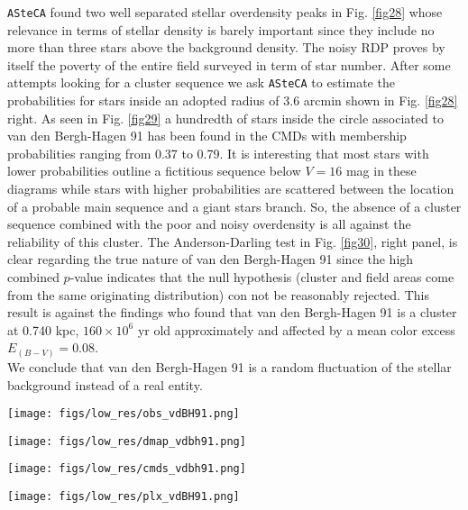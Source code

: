 \documentclass{aa}
\begin{document}
\texttt{ASteCA} found two well separated stellar overdensity peaks in Fig.
\ref{fig28} whose relevance in terms of stellar density is barely important
since they include no more than three stars above the background density. The
noisy RDP proves by itself the poverty of the entire field surveyed in term of
star number. After some attempts looking for a cluster sequence we ask
\texttt{ASteCA} to estimate the probabilities for stars inside an adopted radius
of 3.6 arcmin shown in Fig. \ref{fig28} right. As seen in Fig. \ref{fig29} a
hundredth of stars inside the circle associated to van den Bergh-Hagen 91 has
been found in the CMDs with membership probabilities ranging from 0.37 to 0.79.
It is interesting that most stars with lower probabilities outline a fictitious
sequence below $V = 16$ mag in these diagrams while stars with higher
probabilities are scattered between the location of a probable main sequence and
a giant stars branch. So, the absence of a cluster sequence combined with the
poor and noisy overdensity is all against the reliability of this cluster. The
Anderson-Darling test in Fig. \ref{fig30}, right panel, is clear regarding the
true nature of van den Bergh-Hagen 91 since the high combined $p$-value
indicates that the null hypothesis (cluster and field areas come from the same
originating distribution) con not be reasonably rejected. This result is against
the \cite{Kharchenko_2005} findings who found
that van den Bergh-Hagen 91 is a cluster at 0.740 kpc, $160\times10^6$ yr old
approximately and affected by a mean color excess $E_{(B-V)} = 0.08$.\\

We conclude that van den Bergh-Hagen 91 is a random fluctuation of the stellar
background instead of a real entity.

\begin{figure*}[ht]
    \centering
    \texttt{[image: figs/low\_res/obs\_vdBH91.png]}
    \caption{Idem Fig. \ref{fig3} for van den Bergh-Hagen 91.}
    \label{fig27}
\end{figure*}
\begin{figure*}[ht]
    \centering
    \texttt{[image: figs/low\_res/dmap\_vdbh91.png]}
    \caption{Idem Fig. \ref{fig4} for van den Bergh-Hagen 91.}
    \label{fig28}
\end{figure*}
\begin{figure*}[ht]
    \centering
    \texttt{[image: figs/low\_res/cmds\_vdbh91.png]}
    \caption{Idem Fig. \ref{fig5} for van den Bergh-Hagen 91.}
    \label{fig29}
\end{figure*}
\begin{figure*}[ht]
    \centering
    \texttt{[image: figs/low\_res/plx\_vdBH91.png]}
    \caption{Idem Fig. \ref{fig6} for van den Bergh-Hagen 91.}
    \label{fig30}
\end{figure*}
\end{document}
